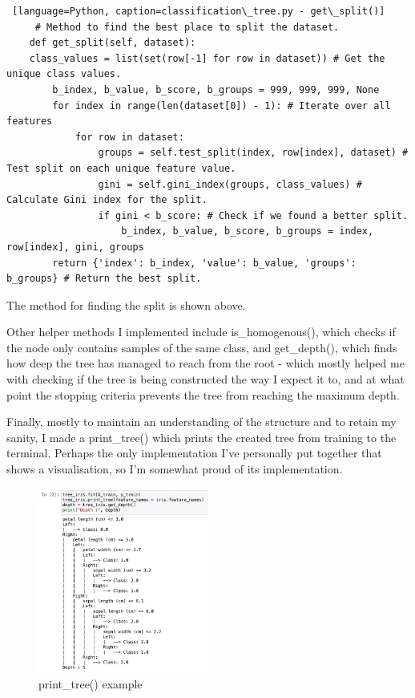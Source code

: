 \documentclass[letterpaper,10pt]{article}
\begin{document}
\begin{lstlisting} [language=Python, caption=classification\_tree.py - get\_split()]
     # Method to find the best place to split the dataset.
    def get_split(self, dataset):
    class_values = list(set(row[-1] for row in dataset)) # Get the unique class values.
        b_index, b_value, b_score, b_groups = 999, 999, 999, None
        for index in range(len(dataset[0]) - 1): # Iterate over all features
            for row in dataset:
                groups = self.test_split(index, row[index], dataset) # Test split on each unique feature value.
                gini = self.gini_index(groups, class_values) # Calculate Gini index for the split.
                if gini < b_score: # Check if we found a better split.
                    b_index, b_value, b_score, b_groups = index, row[index], gini, groups
        return {'index': b_index, 'value': b_value, 'groups': b_groups} # Return the best split.
\end{lstlisting}

The method for finding the split is shown above. \par
Other helper methods I implemented include is\_homogenous(), which checks if the node only contains samples of the same class, and get\_depth(), which finds how deep the tree has managed to reach from the root - which mostly helped me with checking if the tree is being constructed the way I expect it to, and at what point the stopping criteria prevents the tree from reaching the maximum depth. \par
Finally, mostly to maintain an understanding of the structure and to retain my sanity, I made a print\_tree() which prints the created tree from training to the terminal. Perhaps the only implementation I've personally put together that shows a visualisation, so I'm somewhat proud of its implementation. \par

\begin{figure}[ht]
    \centering
    \includegraphics[width=0.5\textwidth]{printtree.png}
    \caption{print\_tree() example}
    \label{fig:printtree}
\end{figure}
\end{document}
